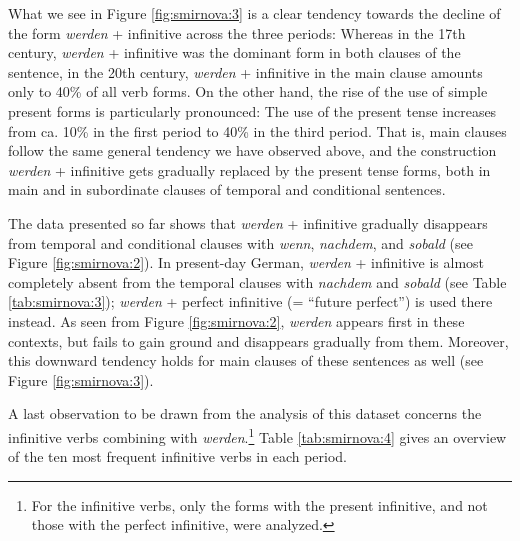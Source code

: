 \documentclass[output=paper,colorlinks,citecolor=brown]{langscibook}
\begin{document}
\par What we see in Figure \ref{fig:smirnova:3} is a clear tendency towards the decline of the form \emph{werden} + infinitive across the three periods: Whereas in the 17th century, \emph{werden} + infinitive was the dominant form in both clauses of the sentence, in the 20th century, \emph{werden} + infinitive in the main clause amounts only to 40\% of all verb forms. On the other hand, the rise of the use of simple present forms is particularly pronounced: The use of the present tense increases from ca. 10\% in the first period to 40\% in the third period. That is, main clauses follow the same general tendency we have observed above, and the construction \emph{werden} + infinitive gets gradually replaced by the present tense forms, both in main and in subordinate clauses of temporal and conditional sentences.

\par The data presented so far shows that \emph{werden} + infinitive gradually disappears from temporal and conditional clauses with \emph{wenn}, \emph{nachdem}, and \emph{sobald} (see Figure \ref{fig:smirnova:2}). In present-day German, \emph{werden} + infinitive is almost completely absent from the temporal clauses with \emph{nachdem} and \emph{sobald} (see Table \ref{tab:smirnova:3}); \emph{werden} + perfect infinitive (= ``future perfect'') is used there instead. As seen from Figure \ref{fig:smirnova:2}, \emph{werden} appears first in these contexts, but fails to gain ground and disappears gradually from them. Moreover, this downward tendency holds for main clauses of these sentences as well (see Figure \ref{fig:smirnova:3}).

\par A last observation to be drawn from the analysis of this dataset concerns the infinitive verbs combining with \emph{werden}.\footnote{For the infinitive verbs, only the forms with the present infinitive, and not those with the perfect infinitive, were analyzed.} Table \ref{tab:smirnova:4} gives an overview of the ten most frequent infinitive verbs in each period. 
\end{document}
